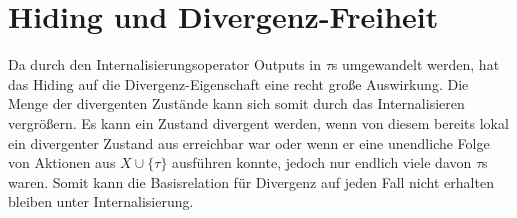 \section{Hiding und Divergenz-Freiheit}

Da durch den Internalisierungsoperator Outputs in $\tau$s umgewandelt werden,
hat das Hiding auf die Divergenz-Eigenschaft eine recht große Auswirkung. Die
Menge der divergenten Zustände kann sich somit durch das Internalisieren
vergrößern. Es kann ein Zustand divergent werden, wenn von diesem bereits
lokal ein divergenter Zustand aus erreichbar war oder wenn er eine unendliche
Folge von Aktionen aus $X\cup\{\tau\}$ ausführen konnte, jedoch nur endlich
viele davon $\tau$s waren. Somit kann die Basisrelation für Divergenz auf jeden
Fall nicht erhalten bleiben unter Internalisierung.
